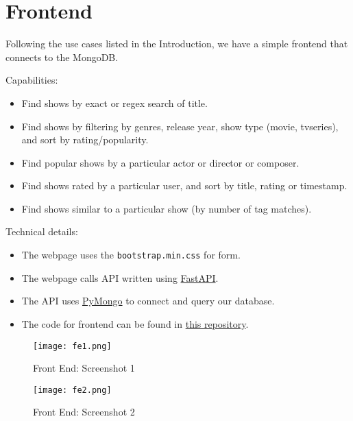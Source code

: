 \documentclass[10pt,titlepage]{article}
\begin{document}
\section{Frontend}
Following the use cases listed in the Introduction, we have a simple frontend that connects to the MongoDB.

Capabilities:
\begin{itemize}
    \item Find shows by exact or regex search of title.
    \item Find shows by filtering by genres, release year, show type (movie, tvseries), and sort by rating/popularity.
    \item Find popular shows by a particular actor or director or composer.
    \item Find shows rated by a particular user, and sort by title, rating or timestamp.
    \item Find shows similar to a particular show (by number of tag matches).
\end{itemize}

Technical details:
\begin{itemize}
    \item The webpage uses the \texttt{bootstrap.min.css} for form.
    \item The webpage calls API written using \href{https://fastapi.tiangolo.com/}{FastAPI}.
    \item The API uses \href{https://pypi.org/project/pymongo/}{PyMongo} to connect and query our database.
    \item The code for frontend can be found in \href{https://github.com/recurze/MiniMovieDB}{this repository}.
\end{itemize}

\begin{center}
    \begin{figure}[H]
        \centering
        \texttt{[image: fe1.png]}
        \caption{Front End: Screenshot 1}
        \label{fig:fe1}
    \end{figure}
\end{center}

\begin{center}
    \begin{figure}[H]
        \centering
        \texttt{[image: fe2.png]}
        \caption{Front End: Screenshot 2}
        \label{fig:fe2}
    \end{figure}
\end{center}
\end{document}

